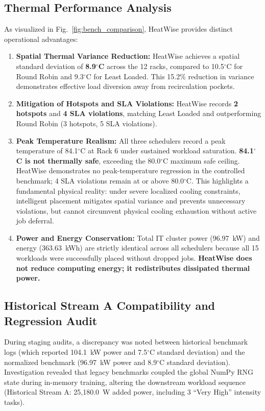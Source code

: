 \documentclass[conference,10pt]{IEEEtran}
\begin{document}
\subsection{Thermal Performance Analysis}
As visualized in Fig.~\ref{fig:bench_comparison}, HeatWise provides distinct operational advantages:
\begin{enumerate}
    \item \textbf{Spatial Thermal Variance Reduction:} HeatWise achieves a spatial standard deviation of \textbf{8.9$^\circ$C} across the 12 racks, compared to 10.5$^\circ$C for Round Robin and 9.3$^\circ$C for Least Loaded. This 15.2\% reduction in variance demonstrates effective load diversion away from recirculation pockets.
    \item \textbf{Mitigation of Hotspots and SLA Violations:} HeatWise records \textbf{2 hotspots} and \textbf{4 SLA violations}, matching Least Loaded and outperforming Round Robin (3 hotspots, 5 SLA violations).
    \item \textbf{Peak Temperature Realism:} All three schedulers record a peak temperature of 84.1$^\circ$C at Rack 6 under sustained workload saturation. \textbf{84.1$^\circ$C is not thermally safe}, exceeding the 80.0$^\circ$C maximum safe ceiling. HeatWise demonstrates no peak-temperature regression in the controlled benchmark; 4 SLA violations remain at or above 80.0$^\circ$C. This highlights a fundamental physical reality: under severe localized cooling constraints, intelligent placement mitigates spatial variance and prevents unnecessary violations, but cannot circumvent physical cooling exhaustion without active job deferral.
    \item \textbf{Power and Energy Conservation:} Total IT cluster power (96.97~kW) and energy (363.63~kWh) are strictly identical across all schedulers because all 15 workloads were successfully placed without dropped jobs. \textbf{HeatWise does not reduce computing energy; it redistributes dissipated thermal power.}
\end{enumerate}

\subsection{Historical Stream A Compatibility and Regression Audit}
During staging audits, a discrepancy was noted between historical benchmark logs (which reported 104.1~kW power and 7.5$^\circ$C standard deviation) and the normalized benchmark (96.97~kW power and 8.9$^\circ$C standard deviation). Investigation revealed that legacy benchmarks coupled the global NumPy RNG state during in-memory training, altering the downstream workload sequence (Historical Stream A: 25,180.0~W added power, including 3 ``Very High'' intensity tasks).
\end{document}
